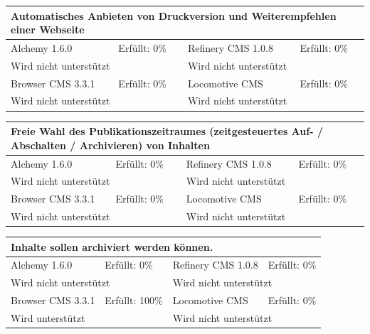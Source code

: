 \newline
\newline
\newline
\begin{tabular}[!ht]{|l|l|l|l|}
\hline
\multicolumn{4}{|p{15cm}|}{\textbf{Automatisches Anbieten von Druckversion und Weiterempfehlen einer Webseite}} \\
\hline
  Alchemy 1.6.0 & \cellcolor{red}Erfüllt: 0\% & Refinery CMS 1.0.8 & \cellcolor{red}Erfüllt: 0\% \\
  \hline
  \multicolumn{2}{|p{7.5cm}|}{Wird nicht unterstützt} & \multicolumn{2}{p{7.5cm}|}{Wird nicht unterstützt} \\
  \hline
  Browser CMS 3.3.1 & \cellcolor{red}Erfüllt: 0\% & Locomotive CMS & \cellcolor{red}Erfüllt: 0\% \\
  \hline
  \multicolumn{2}{|p{7.5cm}|}{Wird nicht unterstützt} & \multicolumn{2}{p{7.5cm}|}{Wird nicht unterstützt} \\
\hline
\end{tabular}
\newline
\newline
\newline
\begin{tabular}[!ht]{|l|l|l|l|}
\hline
\multicolumn{4}{|p{15cm}|}{\textbf{Freie Wahl des Publikationszeitraumes (zeitgesteuertes Auf- / Abschalten / Archivieren) von Inhalten}} \\
\hline
  Alchemy 1.6.0 & \cellcolor{red}Erfüllt: 0\% & Refinery CMS 1.0.8 & \cellcolor{red}Erfüllt: 0\% \\
  \hline
  \multicolumn{2}{|p{7.5cm}|}{Wird nicht unterstützt} & \multicolumn{2}{p{7.5cm}|}{Wird nicht unterstützt} \\
  \hline
  Browser CMS 3.3.1 & \cellcolor{red}Erfüllt: 0\% & Locomotive CMS & \cellcolor{red}Erfüllt: 0\% \\
  \hline
  \multicolumn{2}{|p{7.5cm}|}{Wird nicht unterstützt} & \multicolumn{2}{p{7.5cm}|}{Wird nicht unterstützt} \\
\hline
\end{tabular}
\newline
\newline
\newline
\begin{tabular}[!ht]{|l|l|l|l|}
\hline
\multicolumn{4}{|p{15cm}|}{\textbf{Inhalte sollen archiviert werden können.}} \\
\hline
  Alchemy 1.6.0 & \cellcolor{red}Erfüllt: 0\% & Refinery CMS 1.0.8 & \cellcolor{red}Erfüllt: 0\% \\
  \hline
  \multicolumn{2}{|p{7.5cm}|}{Wird nicht unterstützt} & \multicolumn{2}{p{7.5cm}|}{Wird nicht unterstützt} \\
  \hline
  Browser CMS 3.3.1 & \cellcolor{green}Erfüllt: 100\% & Locomotive CMS & \cellcolor{red}Erfüllt: 0\% \\
  \hline
  \multicolumn{2}{|p{7.5cm}|}{Wird unterstützt} & \multicolumn{2}{p{7.5cm}|}{Wird nicht unterstützt} \\
\hline
\end{tabular}

